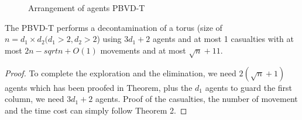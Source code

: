 \begin{figure} [H]
  \caption{Arrangement of agents PBVD-T} 
  \label{fig:torus} %
\end{figure}

\begin{theorem}
The PBVD-T performs a decontamination of a torus (size of $n=d_1\times d_2(d_1>2,d_2>2$) using $3d_1+2$ agents and at most 1 casualties with at most $2n-sqrt{n}+O(1)$ movements and at most $\sqrt{n}+11$.
\end{theorem}
\begin{proof}
To complete the exploration and the elimination, we need $2(\sqrt{n}+1)$ agents which has been proofed in Theorem, plus the $d_1$ agents to guard the first column, we need $3d_1+2$ agents. Proof of the casualties, the number of movement and the time cost can simply follow Theorem 2.
\end{proof}







